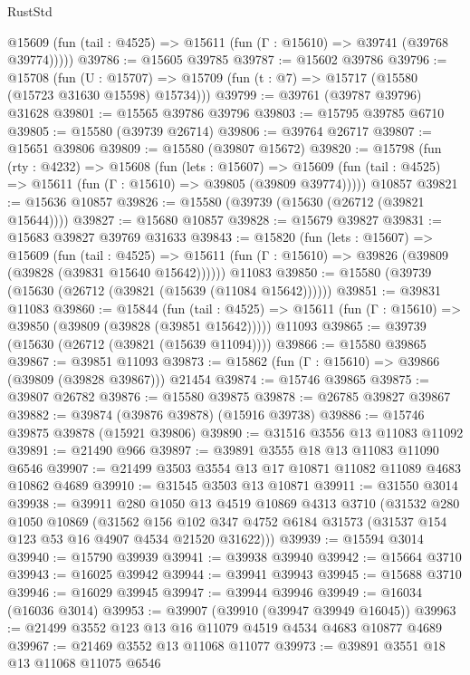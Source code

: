 \begin{lexlean}{RustStd}
\begin{coremodule}
      @15609 (fun (tail : @4525) => @15611 (fun (Γ : @15610) => @39741 (@39768 @39774)))))
@39786 := @15605 @39785
@39787 := @15602 @39786
@39796 := @15708
    (fun (U : @15707) => @15709 (fun (t : @7) => @15717 (@15580 (@15723 @31630 @15598) @15734)))
@39799 := @39761 (@39787 @39796) @31628
@39801 := @15565 @39786 @39796
@39803 := @15795 @39785 @6710
@39805 := @15580 (@39739 @26714)
@39806 := @39764 @26717
@39807 := @15651 @39806
@39809 := @15580 (@39807 @15672)
@39820 := @15798
    (fun (rty : @4232) =>
    @15608
      (fun (lets : @15607) =>
      @15609 (fun (tail : @4525) => @15611 (fun (Γ : @15610) => @39805 (@39809 @39774)))))
    @10857
@39821 := @15636 @10857
@39826 := @15580 (@39739 (@15630 (@26712 (@39821 @15644))))
@39827 := @15680 @10857
@39828 := @15679 @39827
@39831 := @15683 @39827 @39769 @31633
@39843 := @15820
    (fun (lets : @15607) =>
    @15609
      (fun (tail : @4525) =>
      @15611 (fun (Γ : @15610) => @39826 (@39809 (@39828 (@39831 @15640 @15642))))))
    @11083
@39850 := @15580 (@39739 (@15630 (@26712 (@39821 (@15639 (@11084 @15642))))))
@39851 := @39831 @11083
@39860 := @15844
    (fun (tail : @4525) => @15611 (fun (Γ : @15610) => @39850 (@39809 (@39828 (@39851 @15642)))))
    @11093
@39865 := @39739 (@15630 (@26712 (@39821 (@15639 @11094))))
@39866 := @15580 @39865
@39867 := @39851 @11093
@39873 := @15862 (fun (Γ : @15610) => @39866 (@39809 (@39828 @39867))) @21454
@39874 := @15746 @39865
@39875 := @39807 @26782
@39876 := @15580 @39875
@39878 := @26785 @39827 @39867
@39882 := @39874 (@39876 @39878) (@15916 @39738)
@39886 := @15746 @39875 @39878 (@15921 @39806)
@39890 := @31516 @3556 @13 @11083 @11092
@39891 := @21490 @966
@39897 := @39891 @3555 @18 @13 @11083 @11090 @6546
@39907 := @21499 @3503 @3554 @13 @17 @10871 @11082 @11089 @4683 @10862 @4689
@39910 := @31545 @3503 @13 @10871
@39911 := @31550 @3014
@39938 := @39911
    @280
    @1050
    @13
    @4519
    @10869
    @4313
    @3710
    (@31532
      @280
      @1050
      @10869
      (@31562
        @156
        @102
        @347
        @4752
        @6184
        @31573
        (@31537 @154 @123 @53 @16 @4907 @4534 @21520 @31622)))
@39939 := @15594 @3014
@39940 := @15790 @39939
@39941 := @39938 @39940
@39942 := @15664 @3710
@39943 := @16025 @39942
@39944 := @39941 @39943
@39945 := @15688 @3710
@39946 := @16029 @39945
@39947 := @39944 @39946
@39949 := @16034 (@16036 @3014)
@39953 := @39907 (@39910 (@39947 @39949 @16045))
@39963 := @21499 @3552 @123 @13 @16 @11079 @4519 @4534 @4683 @10877 @4689
@39967 := @21469 @3552 @13 @11068 @11077
@39973 := @39891 @3551 @18 @13 @11068 @11075 @6546

\end{coremodule}
\end{lexlean}
